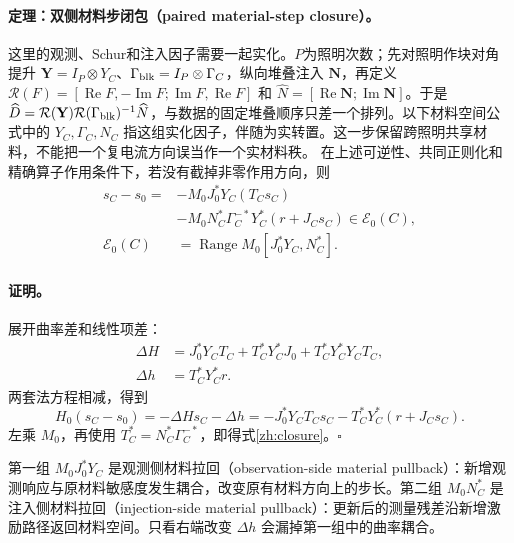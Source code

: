 \paragraph{定理：双侧材料步闭包（paired material-step closure）。}
这里的观测、Schur和注入因子需要一起实化。$P$为照明次数；先对照明作块对角提升 $\mathbf Y=I_P\otimes Y_C$、$\Gamma_{\rm blk}=I_P\otimes\Gamma_C$，纵向堆叠注入 $\mathbf N$，再定义 $\mathcal R(F)=[\operatorname{Re}F,-\operatorname{Im}F;\operatorname{Im}F,\operatorname{Re}F]$ 和 $\widehat N=[\operatorname{Re}\mathbf N;\operatorname{Im}\mathbf N]$。于是 $\widehat D=\mathcal R(\mathbf Y)\mathcal R(\Gamma_{\rm blk})^{-1}\widehat N$，与数据的固定堆叠顺序只差一个排列。以下材料空间公式中的 $Y_C,\Gamma_C,N_C$ 指这组实化因子，伴随为实转置。这一步保留跨照明共享材料，不能把一个复电流方向误当作一个实材料秩。
在上述可逆性、共同正则化和精确算子作用条件下，若没有截掉非零作用方向，则
\begin{equation}\label{zh:closure}
 \begin{aligned}
 s_C-s_0={}&-M_0J_0^*Y_C(T_Cs_C)\\
 &-M_0N_C^*\Gamma_C^{-*}Y_C^*(r+J_Cs_C)
 \in\mathcal E_0(C),\\
 \mathcal E_0(C)&=\operatorname{Range}M_0[J_0^*Y_C,N_C^*].
 \end{aligned}
\end{equation}
\paragraph{证明。}
展开曲率差和线性项差：
\begin{equation}
 \begin{aligned}
 \Delta H&=J_0^*Y_CT_C+T_C^*Y_C^*J_0+T_C^*Y_C^*Y_CT_C,\\
 \Delta h&=T_C^*Y_C^*r.
 \end{aligned}
\end{equation}
两套法方程相减，得到
\begin{equation}
 H_0(s_C-s_0)=-\Delta Hs_C-\Delta h
 =-J_0^*Y_CT_Cs_C-T_C^*Y_C^*(r+J_Cs_C).
\end{equation}
左乘 $M_0$，再使用 $T_C^*=N_C^*\Gamma_C^{-*}$，即得式\eqref{zh:closure}。\hfill$\square$

第一组 $M_0J_0^*Y_C$ 是观测侧材料拉回（observation-side material pullback）：新增观测响应与原材料敏感度发生耦合，改变原有材料方向上的步长。第二组 $M_0N_C^*$ 是注入侧材料拉回（injection-side material pullback）：更新后的测量残差沿新增激励路径返回材料空间。只看右端改变 $\Delta h$ 会漏掉第一组中的曲率耦合。

